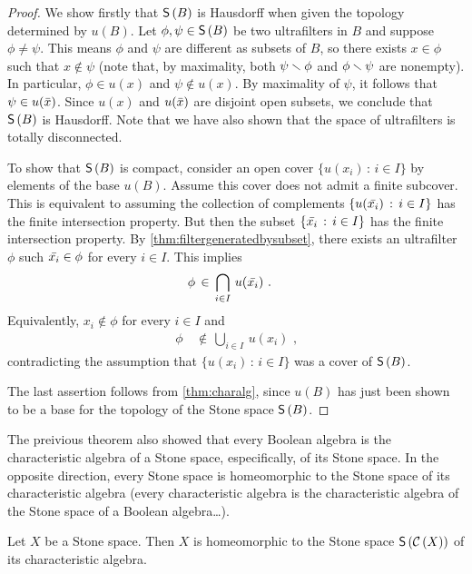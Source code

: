 \begin{proof}
	We show firstly that $\mathsf{S}\left(B\right)$ is Hausdorff when given the
	topology determined by $u(B)$. Let $\phi,\psi\in\mathsf{S}\left(B\right)$
	be two ultrafilters in $B$ and suppose $\phi\not=\psi$. This
	means $\phi$ and $\psi$ are different as subsets of $B$, so
	there exists $x\in\phi$ such that $x\not\in\psi$ (note that, by
	maximality, both $\psi\smallsetminus\phi$ and $\phi\smallsetminus\psi$ are
	nonempty). In particular, $\phi\in u(x)$ and $\psi\not\in u(x)$.
	By maximality of $\psi$, it follows that $\psi\in u(\bar{x})$.
	Since $u(x)$ and $u(\bar{x})$ are disjoint open subsets, we
	conclude that $\mathsf{S}\left(B\right)$ is Hausdorff. Note that we have also
	shown that the space of ultrafilters is totally disconnected.

	To show that $\mathsf{S}\left(B\right)$ is compact, consider an open cover
	$\{u(x_{i})\,:\,i\in I\}$ by elements of the base $u(B)$.
	Assume this cover does not admit a finite subcover.
	This is equivalent to assuming the collection of complements
	$\{u(\bar{x_{i}})\,:\,i\in I\}$ has the finite intersection
	property. But then the subset $\{\bar{x_{i}}\,:\,i\in I\}$ has
	the finite intersection property. By
	\ref{thm:filtergeneratedbysubset}, there exists an ultrafilter
	$\phi$ such $\bar{x_{i}}\in\phi$ for every $i\in I$. This implies
	\begin{align*}
		\phi & \,\in\,\bigcap_{i\in I}\,u(\bar{x_{i}})
		\text{ .}
	\end{align*}
	Equivalently, $x_{i}\not\in\phi$ for every $i\in I$ and
	\begin{align*}
		\phi & \,\not\in\,\bigcup_{i\in I}\,u(x_{i})
		\text{ ,}
	\end{align*}
	contradicting the assumption that $\{u(x_{i})\,:\,i\in I\}$ was
	a cover of $\mathsf{S}\left(B\right)$.

	The last assertion follows from \ref{thm:charalg}, since $u(B)$ has
	just been shown to be a base for the topology of the Stone space
	$\mathsf{S}\left(B\right)$.
\end{proof}

The preivious theorem also showed that every Boolean algebra is the
characteristic algebra of a Stone space, especifically, of its Stone
space. In the opposite direction, every Stone space is homeomorphic to the
Stone space of its characteristic algebra (every characteristic algebra is
the characteristic algebra of the Stone space of a Boolean algebra\dots).

\begin{thmStoneSpaceIsStoneSpaceOfBool}\label{thm:stoneisstoneofbool}
	Let $X$ be a Stone space. Then $X$ is homeomorphic to the
	Stone space $\mathsf{S}\left(\mathcal{C}\left(X\right)\right)$ of its characteristic algebra.
\end{thmStoneSpaceIsStoneSpaceOfBool}

